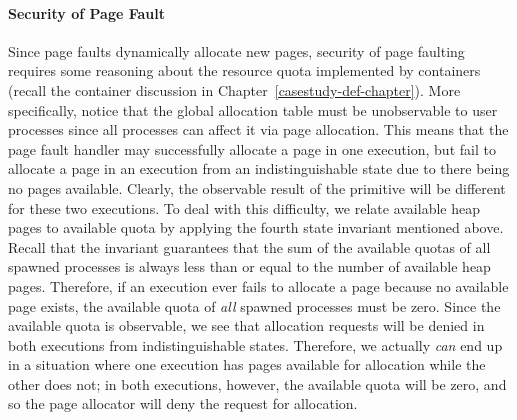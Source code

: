 \paragraph{Security of Page Fault}

Since page faults dynamically allocate new pages, security
of page faulting requires some reasoning about the resource quota 
implemented by containers (recall the container discussion in 
Chapter~\ref{casestudy-def-chapter}). More specifically, notice
that the global allocation table  must be unobservable to
user processes since all processes can affect it via page allocation.
This means that the page fault handler may successfully allocate a page 
in one execution, but fail to allocate a page in an execution from
an indistinguishable state due to there being no pages available. 
Clearly, the observable result of the primitive will be different 
for these two executions. To deal with this difficulty, we relate available 
heap pages to available quota by applying the fourth state invariant 
mentioned above. Recall that the invariant guarantees that the sum 
of the available quotas of all spawned processes is always less than 
or equal to the number of available heap pages. Therefore, if an 
execution ever fails to allocate a page because no available page 
exists, the available quota of \emph{all} spawned processes must be 
zero. Since the available quota is observable, we see that allocation 
requests will be denied in both executions from indistinguishable
states. Therefore, we actually \emph{can} end up in
a situation where one execution has pages available for allocation 
while the other does not;
in both executions, however, the available quota will be zero, and
so the page allocator will deny the request for allocation.

